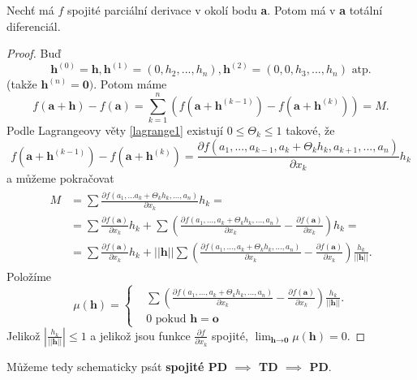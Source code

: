 \documentclass[../main.tex]{subfiles}
\begin{document}
\begin{theorem}
	Nechť má $f$ spojité parciální derivace v okolí bodu \textbf{a}. Potom má v \textbf{a} totální diferenciál.
\end{theorem}

\begin{proof}
	Buď
	\[\textbf{h}^{(0)} = \textbf{h}, \textbf{h}^{(1)} = (0, h_2,...,h_n), \textbf{h}^{(2)} = (0,0,h_3,...,h_n) \textrm{ atp.} \]
	(takže $\textbf{h}^{(n)} = \textbf{0})$.
	Potom máme
	\[f(\textbf{a}+\textbf{h}) - f(\textbf{a}) = \sum^n_{k=1}(f(\textbf{a}+\textbf{h}^{(k-1)})-f(\textbf{a}+\textbf{h}^{(k)})) = M.\]
	Podle Lagrangeovy věty \ref{lagrange1} existují $0 \leq \Theta_k \leq 1$ takové, že
	\[f(\textbf{a}+\textbf{h}^{(k-1)})-f(\textbf{a}+\textbf{h}^{(k)}) = \frac{\partial f(a_1,...,a_{k-1},a_k+ \Theta_kh_k,a_{k+1},...,a_n)}{\partial x_k}h_k\]
	a můžeme pokračovat
	\begin{align*} 
		\begin{split}
			M & = \sum\frac{\partial f(a_1,...a_k+\Theta_kh_k,...,a_n)}{\partial x_k}h_k = \\
			 & = \sum \frac{\partial f(\textbf{a})}{\partial x_k}h_k + \sum \left( \frac{\partial f(a_1,...,a_k+\Theta_kh_k,...,a_n)}{\partial x_k}
			 - \frac{\partial f(\textbf{a})}{\partial x_k} \right)h_k = \\
			 & = \sum \frac{\partial f(\textbf{a})}{\partial x_k}h_k + ||\textbf{h}||\sum\left(\frac{\partial f(a_1,...,a_k+\Theta_kh_k,...,a_n)}
			 {\partial x_k}- \frac{\partial f(\textbf{a})}{\partial x_k}\right)\frac{h_k}{||\textbf{h}||}.
		\end{split}
	\end{align*}
	Položíme
	\[\mu (\textbf{h}) =
	    \begin{cases} & \sum\left(\frac{\partial f(a_1,...,a_k+\Theta_kh_k,...,a_n)}{\partial x_k} -
	    \frac{\partial f(\textbf{a})}{\partial x_k} \right)\frac{h_k}{||\textbf{h}||}.\\
	    & 0 \text{ pokud } \mathbf{h} = \mathbf{o}
	    \end{cases}\]
	Jelikož $\left|\frac{h_k}{||\textbf{h}||}\right| \leq 1$ a jelikož jsou funkce $\frac{\partial f}{\partial x_k}$ spojité,
	$\lim_{\textbf{h}\rightarrow \textbf{0}} \mu (\textbf{h}) = 0$.
\end{proof}

\begin{consequence}
	Můžeme tedy schematicky psát \textbf{spojité PD $\implies$ TD $\implies$ PD}.
\end{consequence}
\end{document}
